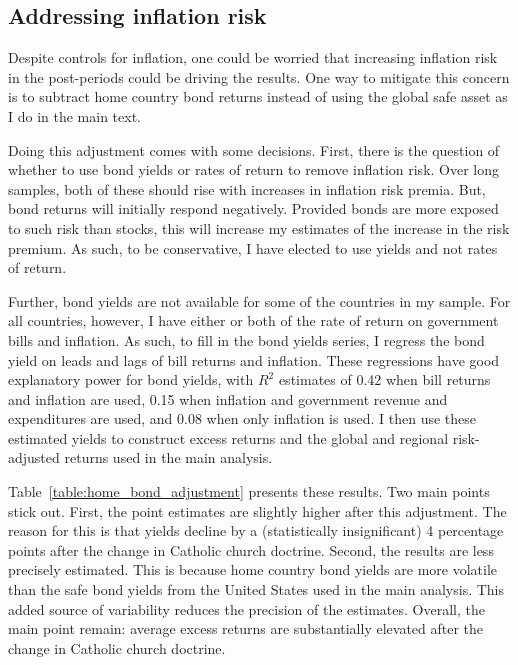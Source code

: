 

\subsection{Addressing inflation risk}\label{section:did_inflation_risk}

Despite controls for inflation, one could be worried that increasing inflation risk in the post-periods could be driving the results.  One way to mitigate this concern is to subtract home country bond returns instead of using the global safe asset as I do in the main text.

Doing this adjustment comes with some decisions. First, there is the question of whether to use bond yields or rates of return to remove inflation risk. Over long samples, both of these should rise with increases in inflation risk premia. But, bond returns will initially respond negatively. Provided bonds are more exposed to such risk than stocks, this will increase my estimates of the increase in the risk premium. As such, to be conservative, I have elected to use yields and not rates of return.

Further, bond yields are not available for some of the countries in my sample. For all countries, however, I have either or both of the rate of return on government bills and inflation. As such, to fill in the bond yields series, I regress the bond yield on leads and lags of bill returns and inflation.  These regressions have good explanatory power for bond yields, with $R^2$ estimates of 0.42 when bill returns and inflation are used,  0.15 when inflation and government revenue and expenditures are used, and 0.08 when only inflation is used. I then use these estimated yields to construct excess returns and the global and regional risk-adjusted returns used in the main analysis.

Table~\ref{table:home_bond_adjustment} presents these results. Two main points stick out. First, the point estimates are slightly higher after this adjustment. The reason for this is that yields decline by a (statistically insignificant) 4 percentage points after the change in Catholic church doctrine. Second, the results are less precisely estimated. This is because home country bond yields are more volatile than the safe bond yields from the United States used in the main analysis. This added source of variability reduces the precision of the estimates. Overall, the main point remain: average excess returns are substantially elevated after the change in Catholic church doctrine.

